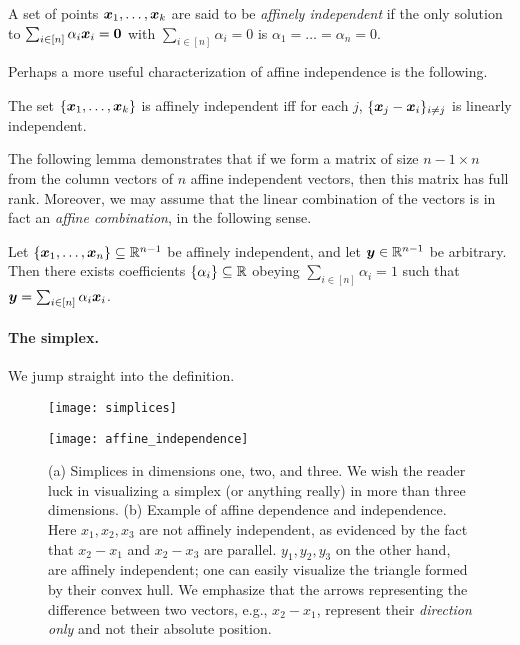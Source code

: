 \begin{definition}
	\label{def:affine_independence}
A set of points $\vb*{x}_1,\dots,\vb*{x}_k$ are said to be \emph{affinely independent} if the only solution to $\sum_{i\in[n]}\alpha_i\vb*{x}_i=\vb{0}$ with $\sum_{i\in [n]}\alpha_i=0$ is $\alpha_1=\dots=\alpha_n=0$. 
\end{definition}

Perhaps a more useful characterization of affine independence is the following. 

\begin{lemma}
	\label{lem:affine-linearly-independent}
	The set $\{\vb*{x}_1,\dots,\vb*{x}_k\}$ is affinely independent iff for each $j$, $\{\vb*{x}_j-\vb*{x}_i\}_{i\neq j}$ is linearly independent. 
\end{lemma}

The following lemma demonstrates that if we form a matrix of size $n-1\times n$ from the column vectors of $n$  affine independent vectors, then this matrix has full rank. Moreover, we may assume that the linear combination of the vectors is in fact an \emph{affine combination}, in the  following sense. 

\begin{lemma}
	\label{lem:barycentric_coeffs}
	Let $\{\vb*{x}_1,\dots,\vb*{x}_n\}\subseteq\mathbb{R}^{n-1}$ be affinely independent, and let  $\vb*{y}\in\mathbb{R}^{n-1}$ be arbitrary. Then there exists coefficients $\{\alpha_i\}\subseteq\mathbb{R}$ obeying $\sum_{i\in[n]}\alpha_i=1$ such that $\vb*{y}=\sum_{i\in[n]}\alpha_i\vb*{x}_i$. 
\end{lemma}

\paragraph{The simplex.} 
We jump straight into the definition. 
\begin{figure}
	\centering
	\begin{minipage}{0.45\textwidth}
		\texttt{[image: simplices]}
		\subcaption{}
		\label{fig:simplices}
	\end{minipage}
	\hspace{0.08\textwidth}
	\begin{minipage}{0.45\textwidth}
		\flushright
		\texttt{[image: affine\_independence]}
		\subcaption{}
		\label{fig:affine_independence}
	\end{minipage}
	\caption{(a) Simplices in dimensions one, two, and three. We wish the reader luck in visualizing a simplex (or anything really) in more than three dimensions. (b) Example of affine dependence and independence.  Here $x_1,x_2,x_3$ are not affinely independent, as evidenced by the fact that $x_2-x_1$ and $x_2-x_3$ are parallel. $y_1,y_2,y_3$ on the other hand, are affinely independent; one can easily visualize the triangle formed by their convex hull. We emphasize that the arrows representing the difference between two vectors, e.g., $x_2-x_1$, represent their \emph{direction only} and  not their absolute position.} 
	\label{fig:simplex+independence}
\end{figure}


